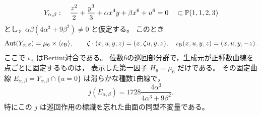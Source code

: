 \begin{proposition}[次数1の楕円固定部分群]
\label{prop:ku-degree-one-intrinsic-cyclic-group}
\[
 Y_{\alpha,\beta}:\quad
 \frac{z^2}{2}+\frac{y^3}{3}+\alpha x^4y+\beta x^6+u^6=0
       \quad\subset\mathbb P(1,1,2,3)
\]
とし，$\alpha\beta(4\alpha^3+9\beta^2)\ne0$ と仮定する。
このとき
\[
 \operatorname{Aut}(Y_{\alpha,\beta})
   =\mu_6\times\langle\iota_{\mathrm B}\rangle,
 \qquad
 \zeta\cdot(x,u,y,z)=(x,\zeta u,y,z),\quad
 \iota_{\mathrm B}(x,u,y,z)=(x,u,y,-z).
\]
ここで $\iota_{\mathrm B}$ はBertini対合である。
位数6の巡回部分群で，生成元が正種数曲線を点ごとに固定するものは，
表示した第一因子 $H_6=\mu_6$ だけである。
その固定曲線 $E_{\alpha,\beta}=Y_{\alpha,\beta}\cap\{u=0\}$ は滑らかな種数1曲線で，
\begin{equation}\label{eq:ku-degree-one-fixed-j}
 j(E_{\alpha,\beta})
   =1728\frac{4\alpha^3}{4\alpha^3+9\beta^2}.
\end{equation}
特にこの $j$ は巡回作用の標識を忘れた曲面の同型不変量である。
\end{proposition}
